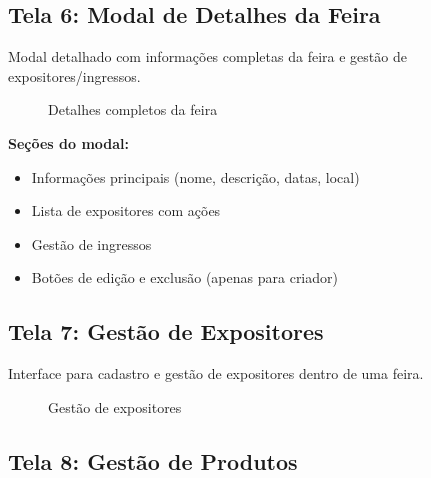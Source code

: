 \documentclass[12pt,a4paper]{article}
\begin{document}
\subsection{Tela 6: Modal de Detalhes da Feira}

Modal detalhado com informações completas da feira e gestão de expositores/ingressos.

\begin{figure}[H]
\centering
{}
\caption{Detalhes completos da feira}
\label{fig:detalhes_feira}
\end{figure}

\textbf{Seções do modal:}
\begin{itemize}
    \item Informações principais (nome, descrição, datas, local)
    \item Lista de expositores com ações
    \item Gestão de ingressos
    \item Botões de edição e exclusão (apenas para criador)
\end{itemize}

\subsection{Tela 7: Gestão de Expositores}

Interface para cadastro e gestão de expositores dentro de uma feira.

\begin{figure}[H]
\centering
{}
\caption{Gestão de expositores}
\label{fig:gestao_expositores}
\end{figure}

\subsection{Tela 8: Gestão de Produtos}
\end{document}
